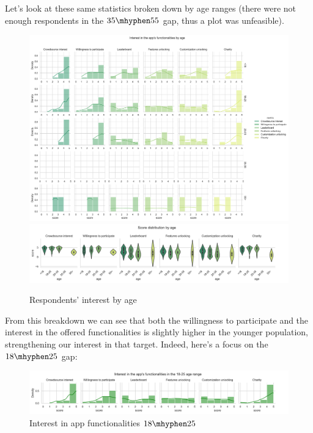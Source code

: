 \documentclass[a4paper, 11pt]{report}
\begin{document}
Let's look at these same statistics broken down by age ranges (there were not enough respondents in the $35 \mhyphen 55$ gap, thus a plot was unfeasible).
\begin{figure}[H]
	\centering
	\includegraphics[width=.9\textwidth]{img/analysis/interest_app_functionalities.pdf}\\
	\includegraphics[width=.9\textwidth]{img/analysis/score_distribution_by_age.pdf}
	\caption{Respondents' interest by age}
\end{figure}
From this breakdown we can see that both the willingness to participate and the interest in the offered functionalities is slightly higher in the younger population, strengthening our interest in that target.
Indeed, here's a focus on the $18 \mhyphen 25$ gap:
\begin{figure}[H]
	\centering
	\includegraphics[width=.95\textwidth, height=.95\textheight, keepaspectratio]{img/analysis/interest_app_functionalities_18_25.pdf}
	\caption{Interest in app functionalities $18 \mhyphen 25$}
\end{figure}
\end{document}
